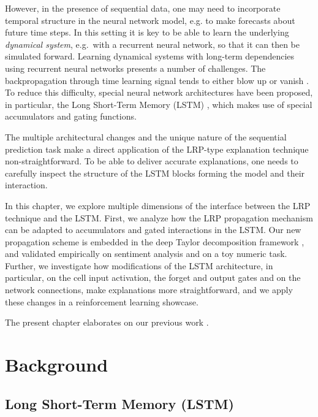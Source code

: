 \documentclass[runningheads]{llncs}
\begin{document}
However, in the presence of sequential data, one may need to incorporate temporal structure in the neural network model, e.g. to make forecasts about future time steps. In this setting it is key to be able to learn the underlying {\em dynamical system}, e.g.\ with a recurrent neural network, so that it can then be simulated forward.
Learning dynamical systems with long-term dependencies using recurrent neural networks presents a number of challenges. 
The backpropagation through time learning signal tends to either blow up or vanish \cite{Arr:Hochreiter:91,Arr:Bengio:94}.
To reduce this difficulty, special neural network architectures have been proposed, in particular, the Long Short-Term Memory (LSTM) \cite{Arr:Hochreiter:91,Arr:Hochreiter:95,Arr:Hochreiter:97}, which makes use of special accumulators and gating functions.

The multiple architectural changes and the unique nature of the sequential prediction task make a direct application of the LRP-type explanation technique non-straightforward. To be able to deliver accurate explanations, one needs to carefully inspect the structure of the LSTM blocks forming the model and their interaction.

In this chapter, we explore multiple dimensions of the interface between the LRP technique and the LSTM. First, we analyze how the LRP propagation mechanism can be adapted to accumulators and gated interactions in the LSTM. Our new propagation scheme is embedded in the deep Taylor decomposition framework \cite{Arr:Montavon:PR2017}, and validated empirically on sentiment analysis and on a toy numeric task. Further, we investigate how modifications of the LSTM architecture, in particular, on the cell input activation, the forget and output gates and on the network connections, make explanations more straightforward, and we apply these changes in a reinforcement learning showcase.

The present chapter elaborates on our previous work \cite{Arr:Arjona-Medina:18,Arr:Arras:19}.

\section{Background}

\subsection{Long Short-Term Memory (LSTM)}
\label{Arr:sec:LSTM}

\end{document}
